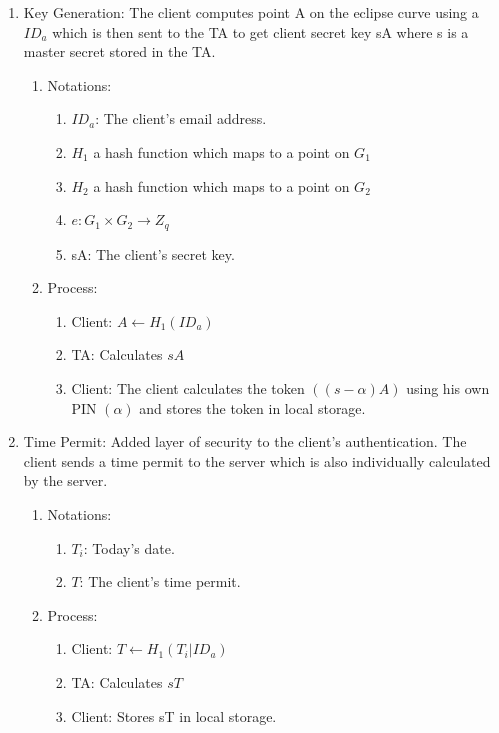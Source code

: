 \documentclass[]{article}   %
\begin{document}
\begin{enumerate}
    \item Key Generation: The client computes point A on the eclipse curve using a $ID_a$ which is then sent to the TA to get client secret key sA where s is a master secret stored in the TA. 
    \begin{enumerate}
        \item Notations: 
        \begin{enumerate}
            \item $ID_a$: The client's email address.
            \item $H_1$ a hash function which maps to a point on $G_1$
            \item $H_2$ a hash function which maps to a point on $G_2$
            \item $e: G_1 \times  G_2 \rightarrow Z_q$
            \item sA: The client's secret key.
        \end{enumerate}
        \item Process: 
        \begin{enumerate}
            \item Client: $A \leftarrow H_1(ID_a) $
            \item TA: Calculates $sA$
            \item Client: The client calculates the token $((s-\alpha)A)$ using his own PIN $(\alpha)$ and stores the token in local storage. 
        \end{enumerate}
    \end{enumerate}
    \item Time Permit: Added layer of security to the client's authentication. The client sends a time permit to the server which is also individually calculated by the server. 
    \begin{enumerate}
        \item Notations:
        \begin{enumerate}
            \item $T_i$: Today's date.
            \item $T$: The client's time permit.
        \end{enumerate}
        \item Process:
        \begin{enumerate}
            \item Client: $T \leftarrow H_1(T_i|ID_a)$
            \item TA: Calculates $sT$
            \item Client: Stores sT in local storage.

\end{enumerate}
\end{enumerate}
\end{enumerate}
\end{document}
